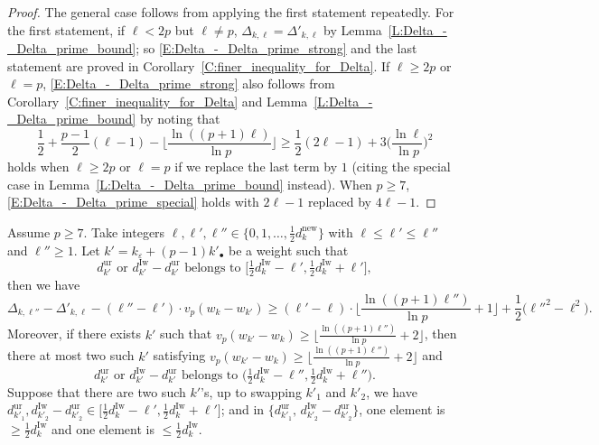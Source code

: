 \begin{proof}
    The general case follows from applying the first statement repeatedly. For the first statement, if $\ell < 2p$ but $\ell \neq p$, $\Delta_{k, \ell} = \Delta'_{k, \ell}$ by Lemma~\ref{L:Delta_-_Delta_prime_bound}; so \eqref{E:Delta_-_Delta_prime_strong} and the last statement are proved in Corollary~\ref{C:finer_inequality_for_Delta}.
    If $\ell \geq 2p$ or $\ell =p$, \eqref{E:Delta_-_Delta_prime_strong} also follows from Corollary~\ref{C:finer_inequality_for_Delta} and Lemma~\ref{L:Delta_-_Delta_prime_bound} by noting that
    \begin{equation}
    \label{E:Delta_-_Delta_prime_special}
    \frac 12+
    \frac{p-1}2(\ell-1) -\Big \lfloor \frac{\ln((p+1) \ell)}{\ln p}\Big\rfloor  \geq \frac 12(2\ell-1) +3 \Big( \frac{\ln \ell }{\ln p}\Big)^2
    \end{equation}
    holds when $\ell \geq 2p$ or $\ell = p$ if we replace the last term by $1$ (citing the special case in Lemma~\ref{L:Delta_-_Delta_prime_bound} instead). When $p \geq 7$, \eqref{E:Delta_-_Delta_prime_special} holds with $2\ell-1$ replaced by $4 \ell -1$.
\end{proof}

\begin{corollary}
    \label{C:Delta_-_Delta_prime_multi}
    Assume $p \geq 7$. Take integers $\ell, \ell', \ell'' \in \{0,1, \dots, \frac 12d_k^{\mathrm{new}}\}$ with $\ell \leq \ell'\leq  \ell''$ and $\ell''\geq 1$.
    Let $k' = k_\varepsilon + (p-1)k'_{\bullet}$ be a weight such that
    $$
    d_{k'}^{\mathrm{ur}}\textrm{ or } d_{k'}^{\mathrm{Iw}}- d_{k'}^{\mathrm{ur}}\textrm{ belongs to } \big[\tfrac 12d_k^{\mathrm{Iw}}-\ell', \tfrac 12 d_k^{\mathrm{Iw}}+\ell'\big],
    $$
    then we have
    \begin{equation}
    \label{E:Delta_l_prime_prime_-Delta_l}
    \Delta_{k, \ell''}- \Delta'_{k, \ell} - (\ell''-\ell') \cdot  v_p(w_k - w_{k'}) \geq (\ell'-\ell) \cdot \Big\lfloor \frac{\ln((p+1)\ell'')}{\ln p}+1\Big\rfloor + \frac 12\big( \ell''^2 - \ell^2\big).
    \end{equation}
    Moreover, if there exists $k'$ such that $v_p(w_{k'}-w_k) \geq \big\lfloor \frac{\ln((p+1)\ell'')}{\ln p}+2\big\rfloor $, then there at most two such $k'$ satisfying $v_p(w_{k'}-w_k) \geq \big\lfloor \frac{\ln((p+1)\ell'')}{\ln p}+2\big\rfloor $ and
    $$
    d_{k'}^{\mathrm{ur}}\textrm{ or } d_{k'}^{\mathrm{Iw}}- d_{k'}^{\mathrm{ur}}\textrm{ belongs to } \big(\tfrac 12d_k^{\mathrm{Iw}}-\ell'', \tfrac 12 d_k^{\mathrm{Iw}}+\ell''\big).
    $$
    Suppose that there are two such $k'$'s, up to swapping $k'_1$ and $k'_2$, we have $d_{k'_1}^{\mathrm{ur}}, d_{k'_2}^{\mathrm{Iw}}-d_{k'_2}^{\mathrm{ur}}\in \big[\frac 12d_k^{\mathrm{Iw}}-\ell', \frac 12d_k^{\mathrm{Iw}}+\ell'\big]$; and in $\{d_{k'_1}^{\mathrm{ur}},\, d_{k'_2}^{\mathrm{Iw}}-d_{k'_2}^{\mathrm{ur}}\}$, one element is $ \geq \frac 12 d_k^{\mathrm{Iw}}$ and one element is $ \leq \frac 12 d_k^{\mathrm{Iw}}$.
\end{corollary}

